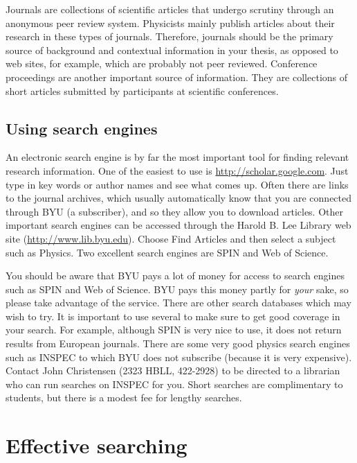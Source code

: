 Journals are collections of scientific articles that undergo
scrutiny through an anonymous peer review system. Physicists mainly
publish articles about their research in these types of journals.
Therefore, journals should be the primary source of background and
contextual information in your thesis, as opposed to web sites, for
example, which are probably not peer reviewed. Conference
proceedings are another important source of information. They are
collections of short articles submitted by participants at
scientific conferences.

\subsection{Using search engines}
\label{ssec:SearchEngines} 

An electronic search engine is by far the most important tool for
finding relevant research information. One of the easiest to use is
\href{http://scholar.google.com/}{\url{http://scholar.google.com}}. Just
type in key words or author names and see what comes up. Often there
are links to the journal archives, which usually automatically know
that you are connected through BYU (a subscriber), and so they allow
you to download articles. Other important search engines can be
accessed through the Harold B. Lee Library web site
(\href{http://www.lib.byu.edu/}{\url{http://www.lib.byu.edu}}).
Choose Find Articles and then select a subject such as Physics. Two
excellent search engines are SPIN and Web of Science.

You should be aware that BYU pays a lot of money for access to
search engines such as SPIN and Web of Science. BYU pays this money
partly for \emph{your} sake, so please take advantage of the
service. There are other search databases which may wish to try. It
is important to use several to make sure to get good coverage in
your search.  For example, although SPIN is very nice to use, it
does not return results from European journals.  There are some very
good physics search engines such as INSPEC to which BYU does not
subscribe (because it is very expensive). Contact John Christensen
(2323 HBLL, 422-2928) to be directed to a librarian who can run
searches on INSPEC for you. Short searches are complimentary to
students, but there is a modest fee for lengthy searches.

\section{Effective searching}
\label{sec:EffSearch} 

